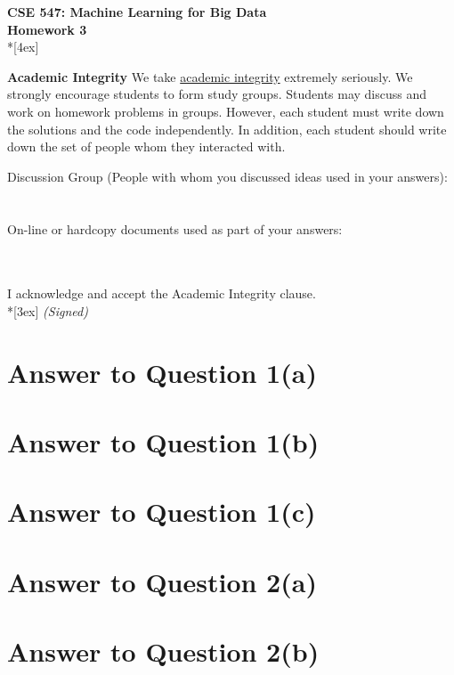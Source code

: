 \documentclass[11pt]{article}
\begin{document}
\thispagestyle{empty}
\parindent 0pt
\vfill
\large

\begin{center}
\LARGE{\bf \textsf{CSE 547: Machine Learning for Big Data}}\\ {\bf \textsf{Homework 3}} 
\\*[4ex]
\end{center}

\textbf{Academic Integrity} We take \href{https://www.cs.washington.edu/academics/misconduct}{academic integrity} extremely seriously. 
We strongly encourage students to form study groups. Students may discuss and work on homework problems in groups. However, each student must write down the solutions and the code independently. In addition, each student should write down the set of people whom they interacted with. 
\bigskip

Discussion Group (People with whom you discussed ideas used in your answers): \\\\\\
\vfill
On-line or hardcopy documents used as part of your answers: \\\\\\

\vfill

I acknowledge and accept the Academic Integrity clause.\\*[3ex]
\bigskip
\textit{(Signed)}\hrulefill

\pagebreak[4]
\section*{Answer to Question 1(a)}

\pagebreak[4]
\section*{Answer to Question 1(b)}

\pagebreak[4]
\section*{Answer to Question 1(c)}

\pagebreak[4]
\section*{Answer to Question 2(a)}

\pagebreak[4]
\section*{Answer to Question 2(b)}
\end{document}

